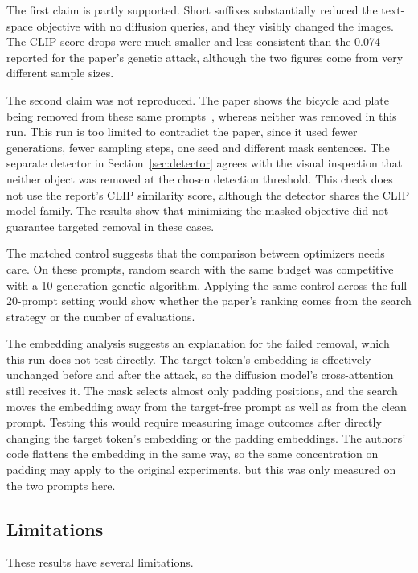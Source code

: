 \documentclass[11pt]{article}
\begin{document}
The first claim is partly supported. Short suffixes substantially reduced the text-space objective with no diffusion queries, and they visibly changed the images. The CLIP score drops were much smaller and less consistent than the 0.074 reported for the paper's genetic attack, although the two figures come from very different sample sizes.

The second claim was not reproduced. The paper shows the bicycle and plate being removed from these same prompts~\cite[Fig.~4]{zhuang2023}, whereas neither was removed in this run. This run is too limited to contradict the paper, since it used fewer generations, fewer sampling steps, one seed and different mask sentences. The separate detector in Section~\ref{sec:detector} agrees with the visual inspection that neither object was removed at the chosen detection threshold. This check does not use the report's CLIP similarity score, although the detector shares the CLIP model family. The results show that minimizing the masked objective did not guarantee targeted removal in these cases.

The matched control suggests that the comparison between optimizers needs care. On these prompts, random search with the same budget was competitive with a 10-generation genetic algorithm. Applying the same control across the full 20-prompt setting would show whether the paper's ranking comes from the search strategy or the number of evaluations.

The embedding analysis suggests an explanation for the failed removal, which this run does not test directly. The target token's embedding is effectively unchanged before and after the attack, so the diffusion model's cross-attention still receives it. The mask selects almost only padding positions, and the search moves the embedding away from the target-free prompt as well as from the clean prompt. Testing this would require measuring image outcomes after directly changing the target token's embedding or the padding embeddings. The authors' code flattens the embedding in the same way, so the same concentration on padding may apply to the original experiments, but this was only measured on the two prompts here.

\subsection{Limitations}

These results have several limitations.
\end{document}
